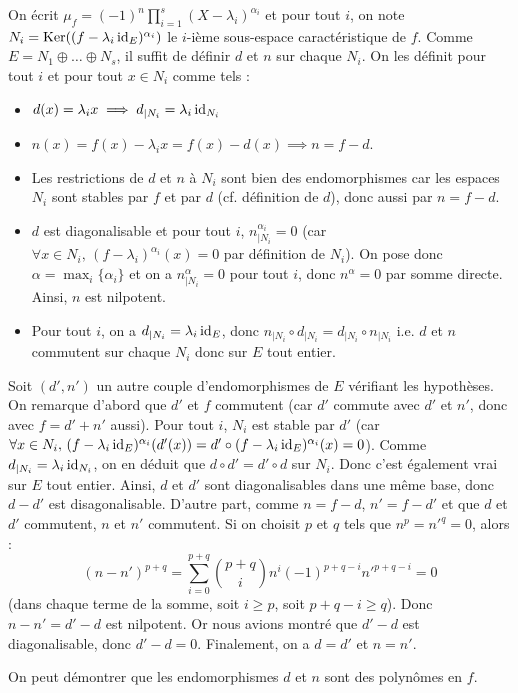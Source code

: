 	\begin{demonstration}
		On écrit $\mu_f = (-1)^n \prod_{i=1}^s (X - \lambda_i)^{\alpha_i}$ et pour tout $i$, on note $N_i = \mathrm{Ker}((f-\lambda_i \operatorname{id}_E)^{\alpha_i})$ le $i$-ième sous-espace caractéristique de $f$.
		\newpar
		 Comme $E = N_1 \oplus \dots \oplus N_s$, il suffit de définir $d$ et $n$ sur chaque $N_i$. On les définit pour tout $i$ et pour tout $x \in N_i$ comme tels :
		\begin{itemize}
			\item $d(x) = \lambda_i x \implies d_{|N_i} = \lambda_i \operatorname{id}_{N_i}$
			\item $n(x) = f(x) - \lambda_i x = f(x) - d(x) \implies n = f - d$.
		\end{itemize}
		\medskip
		\begin{itemize}
			\item Les restrictions de $d$ et $n$ à $N_i$ sont bien des endomorphismes car les espaces $N_i$ sont stables par $f$ et par $d$ (cf. définition de $d$), donc aussi par $n = f - d$.
			\item $d$ est diagonalisable et pour tout $i$, $n_{|N_i}^{\alpha_i} = 0$ (car $\forall x \in N_i, \, (f-\lambda_i)^{\alpha_i}(x) = 0$ par définition de $N_i$). On pose donc $\alpha = \max_{i} \{ \alpha_i \}$ et on a $n_{|N_i}^\alpha = 0$ pour tout $i$, donc $n^\alpha = 0$ par somme directe. Ainsi, $n$ est nilpotent.
			\item Pour tout $i$, on a $d_{|N_i} = \lambda_i \operatorname{id}_E$, donc $n_{|N_i} \circ d_{|N_i} = d_{|N_i} \circ n_{|N_i}$ i.e. $d$ et $n$ commutent sur chaque $N_i$ donc sur $E$ tout entier.
		\end{itemize}
		\medskip
		 Soit $(d', n')$ un autre couple d'endomorphismes de $E$ vérifiant les hypothèses. On remarque d'abord que $d'$ et $f$ commutent (car $d'$ commute avec $d'$ et $n'$, donc avec $f = d' + n'$ aussi). Pour tout $i$, $N_i$ est stable par $d'$ (car $\forall x \in N_i, \, (f-\lambda_i \operatorname{id}_E)^{\alpha_i}(d'(x)) = d' \circ (f-\lambda_i \operatorname{id}_E)^{\alpha_i}(x) = 0$). Comme $d_{|N_i} = \lambda_i \operatorname{id}_{N_i}$, on en déduit que $d \circ d' = d' \circ d$ sur $N_i$. Donc c'est également vrai sur $E$ tout entier. Ainsi, $d$ et $d'$ sont diagonalisables dans une même base, donc $d - d'$ est disagonalisable.
		\newpar
		D'autre part, comme $n = f-d$, $n' = f-d'$ et que $d$ et $d'$ commutent, $n$ et $n'$ commutent. Si on choisit $p$ et $q$ tels que $n^p = n'^q = 0$, alors :
		\[ (n-n')^{p+q} = \sum_{i=0}^{p+q} \binom{p+q}{i} n^{i} (-1)^{p+q-i} n'^{p+q-i} = 0 \]
		(dans chaque terme de la somme, soit $i \geq p$, soit $p+q-i \geq q$). Donc $n - n' = d' - d$ est nilpotent. Or nous avions montré que $d' - d$ est diagonalisable, donc $d'-d = 0$. Finalement, on a $d = d'$ et $n = n'$.
	\end{demonstration}

	\begin{remark}
		On peut démontrer que les endomorphismes $d$ et $n$ sont des polynômes en $f$.
	\end{remark}

